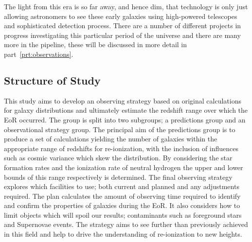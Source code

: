 	The light from this era is so far away, and hence dim, that technology is only just allowing astronomers to see these early galaxies using high-powered telescopes and sophisticated detection process. There are a number of different projects in progress investigating this particular period of the universe and there are many more in the pipeline, these will be discussed in more detail in part~\ref{prt:observations}.

    \subsection{Structure of Study} %
    \label{Structure_of_Study}
		This study aims to develop an observing strategy based on original calculations for galaxy distributions and ultimately estimate the redshift range over which the EoR occurred. The group is split into two subgroups; a predictions group and an observational strategy group. The principal aim of the predictions group is to produce a set of calculations yielding the number of galaxies within the appropriate range of redshifts for re-ionization, with the inclusion of influences such as cosmic variance which skew the distribution. By considering the star formation rates and the ionization rate of neutral hydrogen the upper and lower bounds of this range respectively is determined. The final observing strategy explores which facilities to use; both current and planned and any adjustments required. The plan calculates the amount of observing time required to identify and confirm the properties of galaxies during the EoR. It also considers how to limit objects which will spoil our results; contaminants such as foreground stars and Supernovae events. The strategy aims to see further than previously achieved in this field and help to drive the understanding of re-ionization to new heights.
